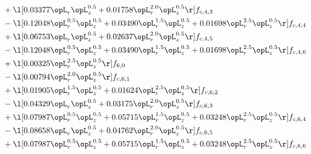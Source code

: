\begin{alignat}{2}
& + \l[  0.03377 \opL_r \opL_z^{0.5} +  0.01758 \opL_r^{2.0} \opL_z^{0.5}  \r] f_{c,4,3} \nonumber \\ 
& - \l[  0.12048 \opL_r^{0.5} \opL_z^{0.5} +  0.03490 \opL_r^{1.5} \opL_z^{0.5} +  0.01698 \opL_r^{2.5} \opL_z^{0.5}  \r] f_{c,4,4} \nonumber \\ 
& + \l[  0.06753 \opL_r \opL_z^{0.5} +  0.02637 \opL_r^{2.0} \opL_z^{0.5}  \r] f_{c,4,5} \nonumber \\ 
& - \l[  0.12048 \opL_r^{0.5} \opL_z^{0.5} +  0.03490 \opL_r^{1.5} \opL_z^{0.5} +  0.01698 \opL_r^{2.5} \opL_z^{0.5}  \r] f_{c,4,6} \nonumber \\ 
& + \l[  0.00325 \opL_r^{2.5} \opL_z^{0.5}  \r] f_{6,0} \nonumber \\ 
& - \l[  0.00794 \opL_r^{2.0} \opL_z^{0.5}  \r] f_{c,6,1} \nonumber \\ 
& + \l[  0.01905 \opL_r^{1.5} \opL_z^{0.5} +  0.01624 \opL_r^{2.5} \opL_z^{0.5}  \r] f_{c,6,2} \nonumber \\ 
& - \l[  0.04329 \opL_r \opL_z^{0.5} +  0.03175 \opL_r^{2.0} \opL_z^{0.5}  \r] f_{c,6,3} \nonumber \\ 
& + \l[  0.07987 \opL_r^{0.5} \opL_z^{0.5} +  0.05715 \opL_r^{1.5} \opL_z^{0.5} +  0.03248 \opL_r^{2.5} \opL_z^{0.5}  \r] f_{c,6,4} \nonumber \\ 
& - \l[  0.08658 \opL_r \opL_z^{0.5} +  0.04762 \opL_r^{2.0} \opL_z^{0.5}  \r] f_{c,6,5} \nonumber \\ 
& + \l[  0.07987 \opL_r^{0.5} \opL_z^{0.5} +  0.05715 \opL_r^{1.5} \opL_z^{0.5} +  0.03248 \opL_r^{2.5} \opL_z^{0.5}  \r] f_{c,6,6} \nonumber \\ 
\end{alignat} 


